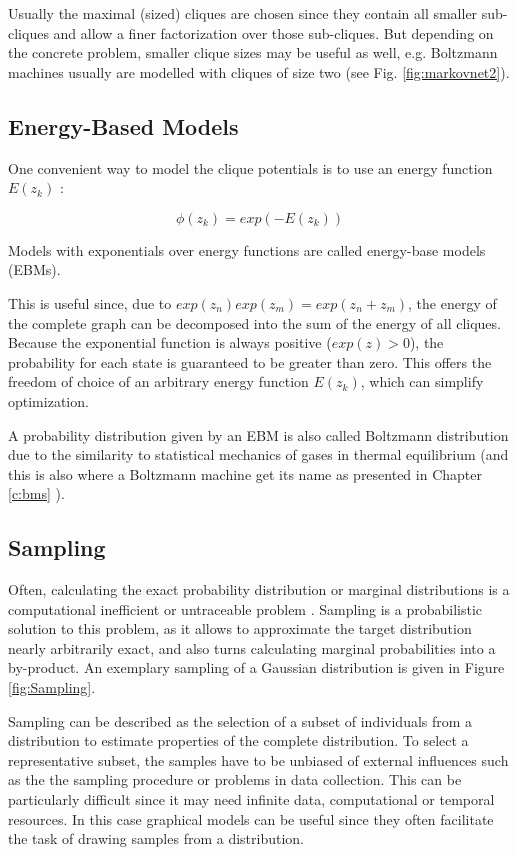 Usually the maximal (sized) cliques are chosen since they contain all smaller sub-cliques and allow a finer factorization over those sub-cliques.
But depending on the concrete problem, smaller clique sizes may be useful as well, e.g. Boltzmann machines usually are modelled with cliques of size two (see Fig. \ref{fig:markovnet2}).




\subsection{Energy-Based Models} \label{c:ebms}

One convenient way to model the clique potentials is to use an energy function $E(z_k)$ \cite{Goodfellow-et-al-2016-Book}: 

\[
\phi(z_k) = exp(- E(z_k))
\]

Models with exponentials over energy functions are called energy-base models (EBMs).

This is useful since, due to $exp(z_n)exp(z_m) = exp(z_n+z_m)$, the energy of the complete graph can be decomposed into the sum of the energy of all cliques.
Because the exponential function is always positive ($exp(z) > 0$), the probability for each state is guaranteed to be greater than zero. 
This offers the freedom of choice of an arbitrary energy function $E(z_k)$, which can simplify optimization. 

A probability distribution given by an EBM is also called Boltzmann distribution due to the similarity to statistical mechanics of gases in thermal equilibrium (and this is also where a Boltzmann machine get its name as presented in Chapter \ref{c:bms} ).

\subsection{Sampling} \label{c:sampling}

Often, calculating the exact probability distribution or marginal distributions is a computational inefficient or untraceable problem \cite{Goodfellow-et-al-2016-Book} \cite{Petrovici2016}.
Sampling is a probabilistic solution to this problem, as it allows to approximate the target distribution nearly arbitrarily exact, and also turns calculating marginal probabilities into a by-product.  
An exemplary sampling of a Gaussian distribution is given in Figure \ref{fig:Sampling}.

Sampling can be described as the selection of a subset of individuals from a distribution to estimate properties of the complete distribution.
To select a representative subset, the samples have to be unbiased of external influences such as the the sampling procedure or problems in data collection.
This can be particularly difficult since it may need infinite data, computational or temporal resources.
In this case graphical models can be useful since they often facilitate the task of drawing samples from a distribution.

